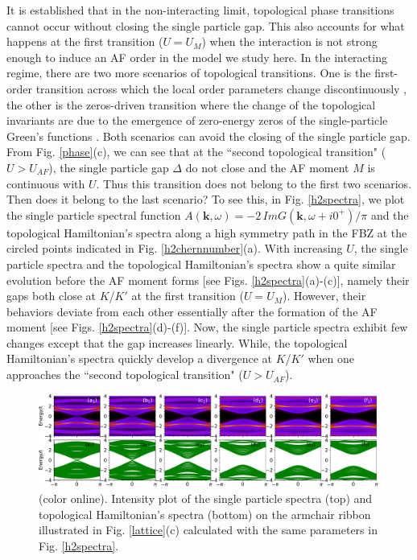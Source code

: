 \documentclass[12pt]{iopart}
\begin{document}
\par It is established that in the non-interacting limit, topological phase transitions cannot occur without closing the single particle gap. This also accounts for what happens at the first transition ($U=U_M$) when the interaction is not strong enough to induce an AF order in the model we study here. In the interacting regime, there are two more scenarios of topological transitions. One is the first-order transition across which the local order parameters change discontinuously \cite{BTS_PRB2013,ZSWZ_PRB2015,ABCTS_PRL2015}, the other is the zeros-driven transition where the change of the topological invariants are due to the emergence of zero-energy zeros of the single-particle Green's functions \cite{G_PRB2011,BTLLZ_PRB2012,SK_PRB2018}. Both scenarios can avoid the closing of the single particle gap. From Fig. \ref{phase}(c), we can see that at the ``second topological transition" ($U>U_{AF}$), the single particle gap $\Delta$ do not close and the AF moment $M$ is continuous with $U$. Thus this transition does not belong to the first two scenarios. Then does it belong to the last scenario? To see this, in Fig. \ref{h2spectra}, we plot the single particle spectral function $A(\mathbf{k},\omega)=-2\,Im G(\mathbf{k},\omega+i0^+)/\pi$ and the topological Hamiltonian's spectra along a high symmetry path in the FBZ at the circled points indicated in Fig. \ref{h2chernnumber}(a). With increasing $U$, the single particle spectra and the topological Hamiltonian's spectra show a quite similar evolution before the AF moment forms [see Figs. \ref{h2spectra}(a)-(c)], namely their gaps both close at $K$/$K'$ at the first transition ($U=U_{M}$). However, their behaviors deviate from each other essentially after the formation of the AF moment [see Figs. \ref{h2spectra}(d)-(f)]. Now, the single particle spectra exhibit few changes except that the gap increases linearly. While, the topological Hamiltonian's spectra quickly develop a divergence at $K$/$K'$ when one approaches the ``second topological transition" ($U>U_{AF}$).

\begin{figure}
\centering
\includegraphics[scale=0.45]{edge}
\caption{(color online). Intensity plot of the single particle spectra (top) and topological Hamiltonian's spectra (bottom) on the armchair ribbon illustrated in Fig. \ref{lattice}(c) calculated with the same parameters in Fig. \ref{h2spectra}.}\label{edge}
\end{figure}
\end{document}
